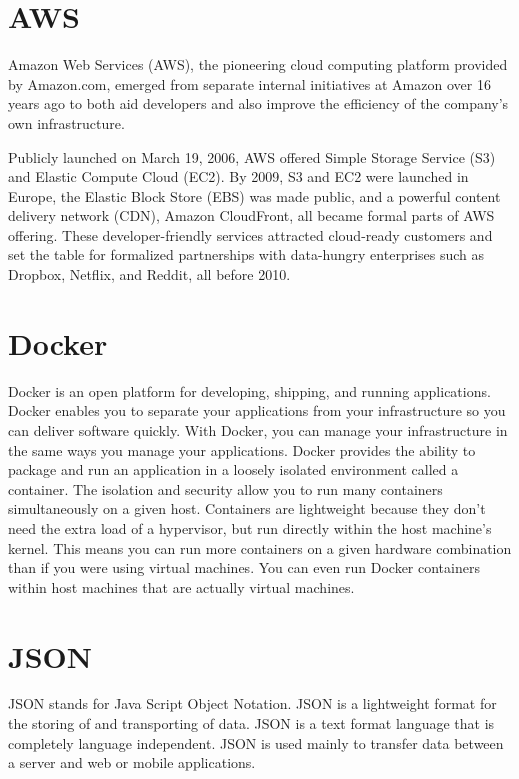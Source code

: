 \section {AWS}
Amazon Web Services (AWS), the pioneering cloud computing platform provided by Amazon.com, emerged from separate internal initiatives at Amazon over 16 years ago to both aid developers and also improve the efficiency of the company’s own infrastructure.\newline

Publicly launched on March 19, 2006, AWS offered Simple Storage Service (S3) and Elastic Compute Cloud (EC2). By 2009, S3 and EC2 were launched in Europe, the Elastic Block Store (EBS) was made public, and a powerful content delivery network (CDN), Amazon CloudFront, all became formal parts of AWS offering. These developer-friendly services attracted cloud-ready customers and set the table for formalized partnerships with data-hungry enterprises such as Dropbox, Netflix, and Reddit, all before 2010.\newline

\section {Docker}
Docker is an open platform for developing, shipping, and running applications. Docker enables you to separate your applications from your infrastructure so you can deliver software quickly. With Docker, you can manage your infrastructure in the same ways you manage your applications. Docker provides the ability to package and run an application in a loosely isolated environment called a container. The isolation and security allow you to run many containers simultaneously on a given host. Containers are lightweight because they don’t need the extra load of a hypervisor, but run directly within the host machine’s kernel. This means you can run more containers on a given hardware combination than if you were using virtual machines. You can even run Docker containers within host machines that are actually virtual machines.

\section {JSON}
JSON stands for Java Script Object Notation. JSON is a lightweight format for the storing of and transporting of data. JSON is a text format language that is completely language independent. JSON is used mainly to transfer data between a server and web or mobile applications. 
\cite{S235271101830050520190101}

\newline



